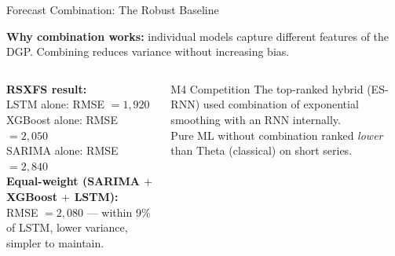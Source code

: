 \documentclass[aspectratio=169, 10pt]{beamer}
\begin{document}
\begin{frame}{Forecast Combination: The Robust Baseline}
  \vspace{0.1cm}

  \textbf{Why combination works:} individual models capture different
  features of the DGP. Combining reduces variance without increasing bias.\\[4pt]

  \begin{columns}[T]
      \begin{keybox}
        {\small \textbf{RSXFS result:}\\[3pt]
        LSTM alone: RMSE $= 1{,}920$\\
        XGBoost alone: RMSE $= 2{,}050$\\
        SARIMA alone: RMSE $= 2{,}840$\\[4pt]
        \textbf{Equal-weight (SARIMA $+$ XGBoost $+$ LSTM):}\\
        RMSE $= 2{,}080$ --- within 9\% of LSTM,
        lower variance, simpler to maintain.}
      \end{keybox}
      \begin{examplebox}{M4 Competition}
        {\small The top-ranked hybrid (ES-RNN) used
        combination of exponential smoothing with
        an RNN internally.\\[3pt]
        Pure ML without combination ranked
        \emph{lower} than Theta (classical) on
        short series. }
      \end{examplebox}
  \end{columns}
\end{frame}
\end{document}
